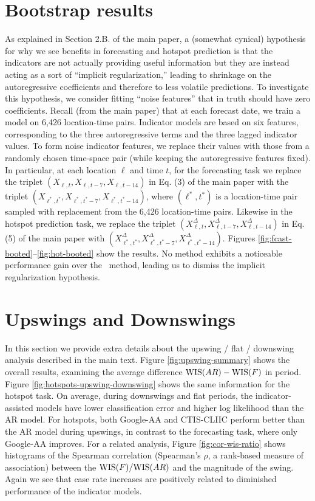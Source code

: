 \section{Bootstrap results}

As explained in Section 2.B. of the main paper, a (somewhat cynical)
hypothesis for why we see benefits in forecasting and hotspot
prediction is that the indicators are not actually providing useful
information but they are instead acting as a sort of ``implicit
regularization,''  leading to shrinkage on the autoregressive
coefficients and therefore to less volatile predictions.  To investigate
this hypothesis, we consider fitting  ``noise features'' that in truth
should have zero coefficients.  Recall (from the main paper) that at each
forecast date, we 
train a model on 6,426 location-time pairs.  Indicator models are
based on six features, corresponding to the three autoregressive terms
and the three lagged indicator values.  To form noise indicator features,
we replace their values with those from a randomly chosen time-space pair
(while keeping the autoregressive 
features fixed).  In particular, at each location $\ell$ and
time $t$, for the forecasting task we replace the triplet $(X_{\ell,t}, X_{\ell,t-7},
X_{\ell,t-14})$ in Eq. (3) of the main paper with the triplet $(X_{\ell^*,t^*},
X_{\ell^*,t^*-7}, 
X_{\ell^*,t^*-14})$, where $(\ell^*,t^*)$ is a location-time pair
sampled with replacement from the 6,426 location-time pairs.  
Likewise in the hotspot prediction task, we replace the triplet
$(X_{\ell,t}^\Delta, X_{\ell,t-7}^\Delta, 
X_{\ell,t-14}^\Delta)$ in Eq. (5) of the main paper with
$(X_{\ell^*,t^*}^\Delta, X_{\ell^*,t^*-7}^\Delta, 
X_{\ell^*,t^*-14}^\Delta)$.
Figures
\ref{fig:fcast-booted}--\ref{fig:hot-booted} show the results.  No
method exhibits a noticeable performance gain over the \ar~method,
leading us to dismiss the implicit regularization hypothesis.



\section{Upswings and Downswings}

In this section we provide extra details about the upswing / flat / downswing 
analysis described in the main text. Figure \ref{fig:upswing-summary} shows
the overall results, examining the average difference $\mathrm{WIS}(AR) - \mathrm{WIS}(F)$ in 
period. Figure \ref{fig:hotspots-upswing-downswing} shows the same information
for the hotspot task. On average, during downswings and flat periods, the 
indicator-assisted models have lower classification error and higher 
log likelihood than the AR model. For hotspots, both Google-AA and CTIS-CLIIC
perform better than the AR model during upswings, in contrast to the forecasting
task, where only Google-AA improves. For a related analysis, Figure 
\ref{fig:cor-wis-ratio} shows histograms of the Spearman
correlation (Spearman's $\rho$, a rank-based measure of association) between
the $\mathrm{WIS}(F)/\mathrm{WIS}(AR)$ and the magnitude of the swing. Again we see that case
rate increases are positively related to diminished performance of the 
indicator models.


